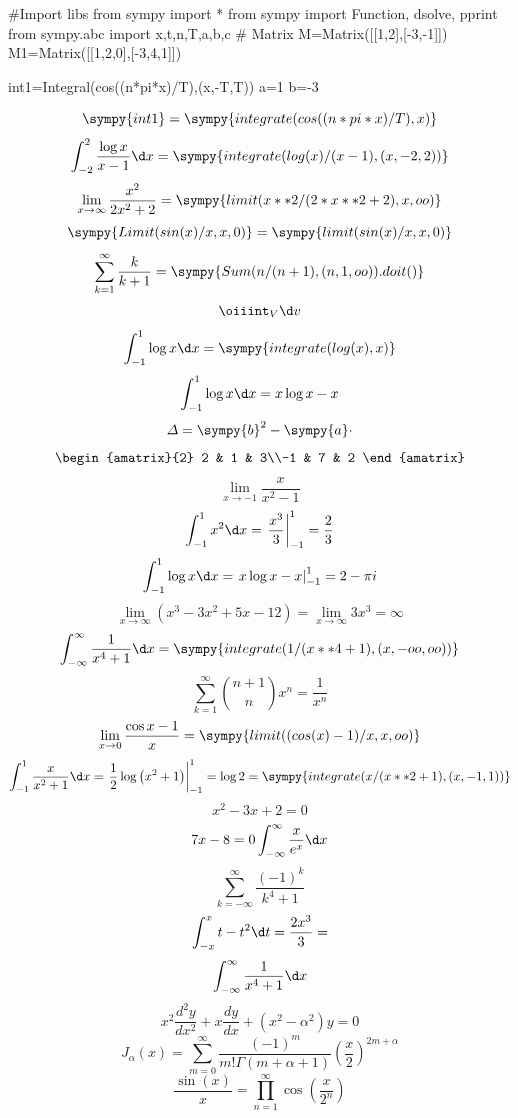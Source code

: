 \documentclass[a4paper,11pt]{article}
\begin{document}
\begin{sympycode}
#Import libs
from sympy import *
from sympy import Function, dsolve, pprint
from sympy.abc import x,t,n,T,a,b,c
# Matrix
M=Matrix([[1,2],[-3,-1]])
M1=Matrix([[1,2,0],[-3,4,1]])

int1=Integral(cos((n*pi*x)/T),(x,-T,T))
a=1
b=-3
\end{sympycode}

\[ \sympy{int1}=\sympy{integrate(cos((n*pi*x)/T),x)} \]
\[ \int_{-2}^{2}{\frac{\log{x}}{x-1}\d x}=\sympy{integrate(log(x)/(x-1),(x,-2,2))} \]
\[ \lim_{x\to \infty}{\frac{x^2}{2x^2+2}}=\sympy{limit(x**2/(2*x**2+2),x,oo)} \]
\[ \sympy{Limit(sin(x)/x,x,0)}=\sympy{limit(sin(x)/x,x,0)} \]
\[ \sum_{k=1}^{\infty}{\frac{k}{k+1}}=\sympy{Sum(n/(n+1),(n,1,oo)).doit()} \]
\[ \oiiint_{V}{\d v} \]
\[ \int_{-1}^{1}{\log{x}\d x}=\sympy{integrate(log(x),x)} \]
\[ \int_{-1}^{1}{\log{x}\d x}=x\log{x}-x \]
\[ \varDelta=\sympy{b}^2-\sympy{a}\cdot \]
\[ \begin{amatrix}{2}
2 & 1 & 3\\-1 & 7 & 2
\end{amatrix} \]
\[ \lim_{x\to-1}{\frac{x}{x^2-1}} \]
\[ \int_{-1}^{1}{x^2\d x}=\left.\frac{x^3}{3}\right|_{-1}^{1}=\frac{2}{3} \]
\[ \int_{-1}^{1}{\log{x}\d x}=\left.x\log{x}-x\right|_{-1}^{1}=2-\pi i \]
\[ \lim_{x\to \infty}{\left(x^3-3x^2+5x-12\right)}=\lim_{x\to \infty}{3x^3}=\infty \]
\[ \int_{-\infty}^{\infty}{\frac{1}{x^4+1}\d x}=\sympy{integrate(1/(x**4+1),(x,-oo,oo))} \]
\[ \sum_{k=1}^{\infty}{\binom{n+1}{n}x^n}=\frac{1}{x^n} \]
\[ \lim_{x\to 0}{\frac{\cos{x}-1}{x}}=\sympy{limit((cos(x)-1)/x,x,oo)} \]
\[ \int_{-1}^{1}{\frac{x}{x^2+1}\d x}=\left.\frac{1}{2}\log{\left(x^2+1\right)}\right|_{-1}^{1}=\log{2}=\sympy{integrate(x/(x**2+1),(x,-1,1))} \]
\[ x^2-3x+2=0 \]
\[ 7x-8=0\int_{-\infty}^{\infty}{\frac{x}{e^x}\d x} \]
\[ \sum_{k=-\infty}^{\infty}{\frac{(-1)^k}{k^4+1}} \]
\[ \int_{-x}^{x}{t-t^2}\d t=\frac{2x^3}{3}= \]
\[ \int_{-\infty}^{\infty}{\frac{1}{x^4+1}\d x} \]
\[ x^{2} \frac{d^{2} y}{d x^{2}}+x \frac{d y}{d x}+\left(x^{2}-\alpha^{2}\right) y=0 \]
\[ J_{\alpha}(x)=\sum_{m=0}^{\infty} \frac{(-1)^{m}}{m ! \Gamma(m+\alpha+1)}\left(\frac{x}{2}\right)^{2 m+\alpha} \]
\[\frac{\sin (x)}{x}=\prod_{n=1}^{\infty} \cos \left(\frac{x}{2^{n}}\right)\]
\end{document}

